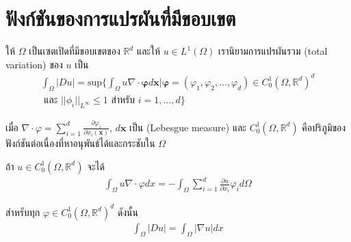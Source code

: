 \section{ฟังก์ชันของการแปรผันที่มีขอบเขต}

\hspace{1cm} ให้ $\Omega$ เป็นเซตเปิดที่มีขอบเขตของ $ \mathbb{R}^{d}$ และให้ $u \in L^{1}(\Omega)$ เรานิยามการแปรผันรวม (total variation) ของ $u$ เป็น
\begin{align} 
    \int_{\Omega} |Du| = \text{sup} \Big\{ \int_\Omega u \nabla \cdot \mathbf{\varphi} d \mathbf{x} | \mathbf{\varphi} = (\varphi_1, \varphi_2, ... , \varphi_d) \in C_0^1 (\Omega, \mathbb{R}^d )^d \\
    \nonumber \text{ และ } || \phi_i ||_{L^{\infty}} \leq 1 \text{ สำหรับ } i = 1,..., d  \Big\}
\end{align}


เมื่อ $\nabla \cdot \varphi = \displaystyle \sum_{i=1}^{d} \frac{\partial \varphi_i}{\partial x_i (\mathbf{x})}$, $d \mathbf{x}$ เป็น (Lebesgue measure) และ $C_0^1 ( \Omega , \mathbb{R}^d)$ คือปริภูมิของฟังก์ชันต่อเนื่องที่หาอนุพันธ์ได้และกระชับใน $\Omega$

\hspace{1cm}ถ้า $u \in C_0^1 (\Omega, \mathbb{R}^d )$ จะได้
\begin{align}
    \int_\Omega u \nabla \cdot \varphi d x = - \int_\Omega \sum_{i=1}^{d} \frac{\partial u}{\partial x_i} \varphi_i d \Omega
\end{align}

สำหรับทุก $\varphi \in C_0^1 (\Omega,\mathbb{R}^{d})^{d} $ ดังนั้น
\begin{align}
    \int_\Omega | D u | = \int_\Omega | \nabla u | dx
\end{align}


